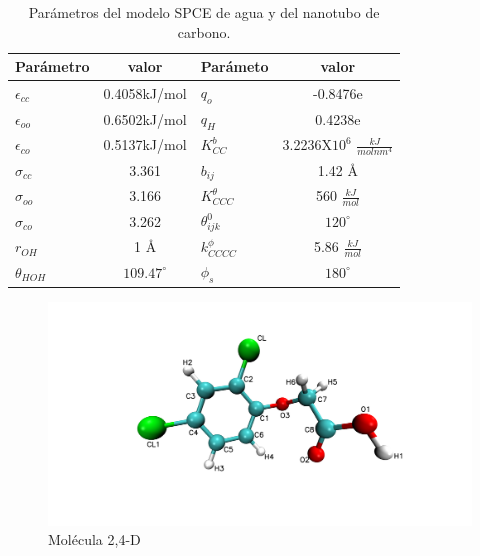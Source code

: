 \begin{table}[!h]
    \centering
    \begin{tabular}{|l|c|l|c|}
    \hline
    Parámetro & valor & Parámeto & valor \\
    \hline
    $\epsilon_{cc}$ & 0.4058kJ/mol & $q_{o}$   & -0.8476e \\
    $\epsilon_{oo}$ & 0.6502kJ/mol &  $q_H$    & 0.4238e \\
    $\epsilon_{co}$ & 0.5137kJ/mol & $K^b_{CC}$& 3.2236X$10^6$ $\frac{kJ}{molnm^4}$\\
    $\sigma_{cc}$   & 3.361        & $b_{ij}$  & 1.42 \AA\\
    $\sigma_{oo}$   & 3.166        & $K^{\theta}_{CCC}$& 560 $\frac{kJ}{mol}$ \\
    $\sigma_{co}$   & 3.262        & $\theta^0_{ijk}$  & $120^{\circ}$ \\
    $r_{OH}$        & 1 \AA        & $k^{\phi}_{CCCC}$ & 5.86 $\frac{kJ}{mol}$ \\
    $\theta_{HOH}$  & $109.47^{\circ}$ & $\phi_s$         & $180^{\circ}$ \\
    \hline
    \end{tabular}
    \caption{Parámetros del modelo SPCE de agua y del nanotubo de carbono. \cite{meng2008}}
    \label{tab:cnth2oparameters}
\end{table}

\begin{figure}[!h]
    \centering
    \includegraphics[width=.9\textwidth,keepaspectratio=true]{figura_nueva_tarea.png}
    \caption{Molécula 2,4-D}
    \label{fig:24Dfigure}
\end{figure}

\newpage

